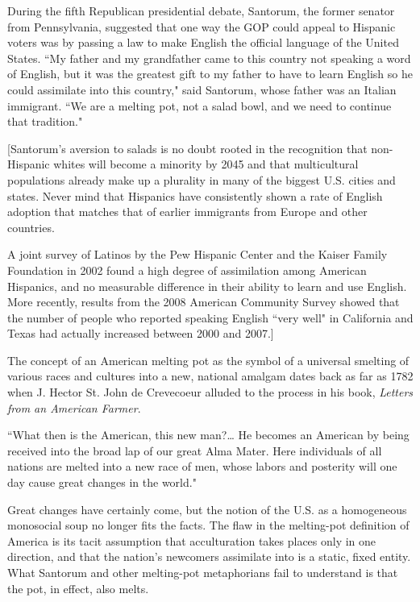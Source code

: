 \documentclass[10pt,a4paper]{article}
\newcommand{\qm}[1]{``#1"}
\begin{document}
During the fifth Republican presidential debate, Santorum, the former senator from Pennsylvania, suggested that one way the GOP could appeal to Hispanic voters was by passing a law to make English the official language of the United States. \qm{My father and my grandfather came to this country not speaking a word of English, but it was the greatest gift to my father to have to learn English so he could assimilate into this country,} said Santorum, whose father was an Italian immigrant. \qm{We are a melting pot, not a salad bowl, and we need to continue that tradition.}

[Santorum's aversion to salads is no doubt rooted in the recognition that non-Hispanic whites will become a minority by 2045 and that multicultural populations already make up a plurality in many of the biggest U.S. cities and states. Never mind that Hispanics have consistently shown a rate of English adoption that matches that of earlier immigrants from Europe and other countries.

A joint survey of Latinos by the Pew Hispanic Center and the Kaiser Family Foundation in 2002 found a high degree of assimilation among American Hispanics, and no measurable difference in their ability to learn and use English. More recently, results from the 2008 American Community Survey showed that the number of people who reported speaking English \qm{very well} in California and Texas had actually increased between 2000 and 2007.]

The concept of an American melting pot as the symbol of a universal smelting of various races and cultures into a new, national amalgam dates back as far as 1782 when J. Hector St. John de Crevecoeur alluded to the process in his book, \textit{Letters from an American Farmer}.

\qm{What then is the American, this new man?\ldots{} He becomes an American by being received into the broad lap of our great Alma Mater. Here individuals of all nations are melted into a new race of men, whose labors and posterity will one day cause great changes in the world.}

Great changes have certainly come, but the notion of the U.S. as a homogeneous monosocial soup no longer fits the facts. The flaw in the melting-pot definition of America is its tacit assumption that acculturation takes places only in one direction, and that the nation's newcomers assimilate into is a static, fixed entity. What Santorum and other melting-pot metaphorians fail to understand is that the pot, in effect, also melts.
\end{document}
